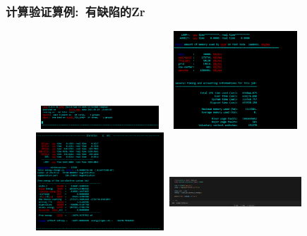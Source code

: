 \begin{frame}
	\frametitle{计算验证算例:~有缺陷的\textrm{Zr}}
\begin{figure}[h!]
\centering
\vskip -0.10in
\includegraphics[height=0.35in,width=1.95in,viewport=0 20 1000 200,clip]{Figures/VASP_huge_USTB-Zr_OUTCAR-Init.png}
\includegraphics[height=1.45in,width=1.95in,viewport=0 0 803 681,clip]{Figures/VASP_huge_USTB-Zr_OUTCAR-Fini.png}
\includegraphics[height=1.45in,width=1.95in,viewport=0 0 1000 868,clip]{Figures/VASP_huge_USTB-Zr_OUTCAR-SCF.png}
\includegraphics[height=1.15in,width=1.95in,viewport=0 0 359 250,clip]{Figures/VASP_huge_USTB-Zr-NEP_energy.png}
\label{VASP_Zr-OUTCAR}
\end{figure} 
\end{frame}

